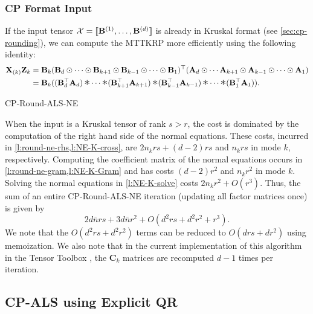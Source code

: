 \documentclass{article}
\newcommand{\mat}[1]{\mathbf{#1}}
\newcommand{\T}[2][]{#1{\mathbf{\cal{#2}}}} 						%
\DeclareMathOperator*{\hada}{\scalebox{1.5}{$\ast$}}
\begin{document}
\subsubsection{CP Format Input}

If the input tensor $\T{X}=[\![\mat{B}^{(1)}, \dots ,\mat{B}^{(d)}]\!]$ is already in Kruskal format (see \cref{sec:cp-rounding}), we can compute the MTTKRP more efficiently using the following identity:
\begin{align*}
  \mat{X}_{(k)}\mat{Z}_k &= \mat{B}_k(\mat{B}_d \odot \dots \odot \mat{B}_{k+1} \odot \mat{B}_{k-1} \odot \dots \odot \mat{B}_1)^\top(\mat{A}_d \odot \cdots \mat{A}_{k+1} \odot \mat{A}_{k-1} \odot \cdots \odot \mat{A}_1) \\
 &= \mat{B}_k((\mat{B}_d^\top\mat{A}_d) \hada \cdots \hada (\mat{B}_{k+1}^\top\mat{A}_{k+1}) \hada (\mat{B}_{k-1}^\top\mat{A}_{k-1}) \hada \cdots \hada (\mat{B}_1^\top\mat{A}_1)).  
\end{align*}

\begin{algorithm}[!ht]
  \caption{CP-Round-ALS-NE}
  \label{alg:cp-als-ne-k}
   
\end{algorithm}


When the input is a Kruskal tensor of rank $s>r$, the cost is dominated by the computation of the right hand side of the normal equations.
These costs, incurred in \cref{l:round-ne-rhs,l:NE-K-cross}, are $2n_krs+(d-2)rs$ and $n_krs$ in mode $k$, respectively.
Computing the coefficient matrix of the normal equations occurs in \cref{l:round-ne-gram,l:NE-K-Gram} and has costs $(d-2)r^2$ and $n_kr^2$ in mode $k$.
Solving the normal equations in \cref{l:NE-K-solve} costs $2n_kr^2 + O(r^3)$.
Thus, the sum of an entire CP-Round-ALS-NE iteration (updating all factor matrices once) is given by
\begin{equation*}
2d\bar{n}rs + 3d\bar{n}r^2 + O(d^2rs + d^2r^2 + r^3).
\end{equation*}
We note that the $O(d^2rs+d^2r^2)$ terms can be reduced to $O(drs+dr^2)$ using memoization.
We also note that in the current implementation of this algorithm in the Tensor Toolbox \cite{TensorToolbox}, the $\mat{C}_k$ matrices are recomputed $d-1$ times per iteration. 


\subsection{CP-ALS using Explicit QR}
\label{sec:alg:expqr}
\end{document}
